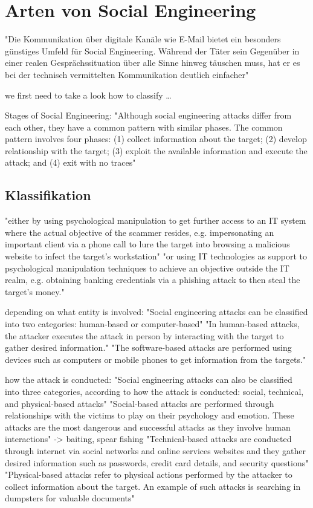 \chapter{Arten von Social Engineering}

"Die Kommunikation über digitale Kanäle wie E-Mail bietet ein besonders günstiges Umfeld für Social Engineering.
Während der Täter sein Gegenüber in einer realen Gesprächssituation über alle Sinne hinweg täuschen muss, hat er
es bei der technisch vermittelten Kommunikation deutlich einfacher"\cite{2_bsi}

we first need to take a look how to classify \dots

Stages of Social Engineering:
"Although social engineering attacks differ from each other, they have a common pattern with similar phases.
The common pattern involves four phases: (1) collect information about the target; (2) develop relationship with
the target; (3) exploit the available information and execute the attack; and (4) exit with no traces"\cite{4_mdpi}

\section{Klassifikation}

"either by using psychological manipulation to get further access to an IT system where the actual objective of
the scammer resides, e.g. impersonating an important client via a phone call to lure the target into browsing a
malicious website to infect the target's workstation"\cite{1_enisa}
"or using IT technologies as support to psychological manipulation techniques to achieve an objective outside
the IT realm, e.g. obtaining banking credentials via a phishing attack to then steal the target's money."\cite{1_enisa}

depending on what entity is involved:
"Social engineering attacks can be classified into two categories: human-based or computer-based"\cite{4_mdpi}
"In human-based attacks, the attacker executes the attack in person by interacting with the target to gather desired information."\cite{4_mdpi}
"The software-based attacks are performed using devices such as computers or mobile phones to get information from the targets."\cite{4_mdpi}

how the attack is conducted:
"Social engineering attacks can also be classified into three categories, according to how the attack is conducted:
social, technical, and physical-based attacks"\cite{4_mdpi}
"Social-based attacks are performed through relationships with the victims to play on their psychology and emotion. These attacks are
the most dangerous and successful attacks as they involve human interactions"\cite{4_mdpi} -> baiting, spear fishing
"Technical-based attacks are conducted through internet via social networks and online services websites and they gather desired
information such as passwords, credit card details, and security questions"\cite{4_mdpi}
"Physical-based attacks refer to physical actions performed by the attacker to collect information about the target. An example
of such attacks is searching in dumpsters for valuable documents"\cite{4_mdpi}



